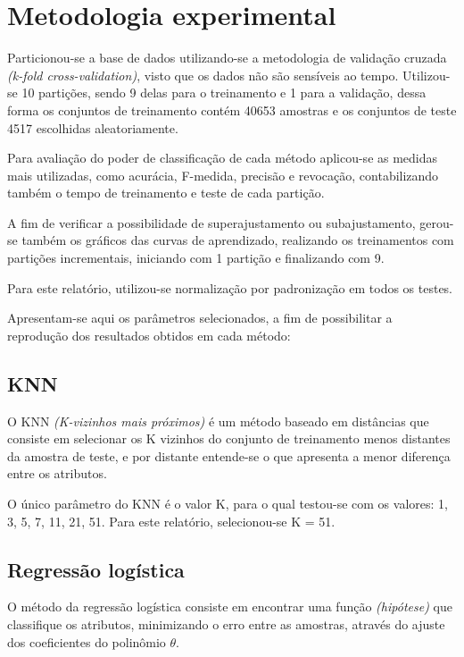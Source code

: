 \section{Metodologia experimental}

Particionou-se a base de dados utilizando-se a metodologia de validação cruzada \emph{(k-fold cross-validation)}, visto que os dados não são sensíveis ao tempo. Utilizou-se 10 partições, sendo 9 delas para o treinamento e 1 para a validação, dessa forma os conjuntos de treinamento contém 40653 amostras e os conjuntos de teste 4517 escolhidas aleatoriamente.

Para avaliação do poder de classificação de cada método aplicou-se as medidas mais utilizadas, como acurácia, F-medida, precisão e revocação, contabilizando também o tempo de treinamento e teste de cada partição.

A fim de verificar a possibilidade de superajustamento ou subajustamento, gerou-se também os gráficos das curvas de aprendizado, realizando os treinamentos com partições incrementais, iniciando com 1 partição e finalizando com 9.

Para este relatório, utilizou-se normalização por padronização em todos os testes.

Apresentam-se aqui os parâmetros selecionados, a fim de possibilitar a reprodução dos resultados obtidos em cada método:

\subsection{KNN}

O KNN \emph{(K-vizinhos mais próximos)} é um método baseado em distâncias que consiste em selecionar os K vizinhos do conjunto de treinamento menos distantes da amostra de teste, e por distante entende-se o que apresenta a menor diferença entre os atributos.

O único parâmetro do KNN é o valor K, para o qual testou-se com os valores: 1, 3, 5, 7, 11, 21, 51. Para este relatório, selecionou-se K = 51.

\subsection{Regressão logística}

O método da regressão logística consiste em encontrar uma função \emph{(hipótese)} que classifique os atributos, minimizando o erro entre as amostras, através do ajuste dos coeficientes do polinômio \(\theta\).

